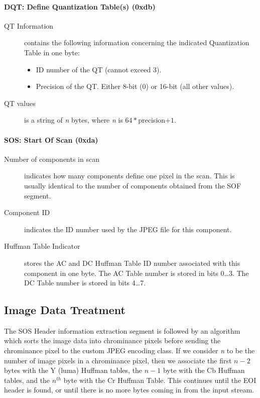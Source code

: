 \paragraph*{DQT: Define Quantization Table(s) (0xdb)}
\begin{description}
	\item[QT Information] contains the following information concerning the indicated Quantization Table in one byte:
		\begin{itemize}
			\item[Bits 0\ldots3] ID number of the QT (cannot exceed 3).
			\item[Bits 4\ldots7] Precision of the QT. Either 8-bit (0) or 16-bit (all other values).
		\end{itemize}
	\item[QT values] is a string of \emph{n} bytes, where \emph{n} is $64*$precision$+1$.
\end{description}

\paragraph*{SOS: Start Of Scan (0xda)}
\begin{description}
	\item[Number of components in scan] indicates how many components define one pixel in the scan. 
		This is usually identical to  the number of components obtained from the SOF segment.
	\item[Component ID] indicates the ID number used by the JPEG file for this component.\footnotemark[1] 
	\item[Huffman Table Indicator] stores the AC and DC Huffman Table ID number associated with this component in one byte. 
		The AC Table number is stored in bits 0\ldots3. The DC Table number is stored in bits 4\ldots7.\footnotemark[1]
\end{description}

\subsection{Image Data Treatment}

The SOS Header information extraction segment is followed by 
an algorithm which sorts the image data into chrominance pixels before 
sending the chrominance pixel to the custom JPEG encoding class. 
If we consider \emph{n} to be the number of image pixels in a chrominance pixel, then 
we associate the first $n - 2$ bytes with the Y (luma) Huffman tables, the $n - 1$ byte with the Cb Huffman tables, and 
the $n^{th}$ byte with the Cr Huffman Table. 
This continues until the EOI header is found, or until there is no more bytes coming in from the input stream.
